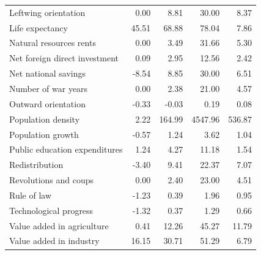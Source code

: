 \documentclass[a4paper,11pt]{article}
\begin{document}
\begin{table}[!ht]
\begin{tabular}{lrrrr}
  Leftwing orientation & 0.00 & 8.81 & 30.00 & 8.37 \\ 
  Life expectancy & 45.51 & 68.88 & 78.04 & 7.86 \\ 
  Natural resources rents & 0.00 & 3.49 & 31.66 & 5.30 \\ 
  Net foreign direct investment & 0.09 & 2.95 & 12.56 & 2.42 \\ 
  Net national savings & -8.54 & 8.85 & 30.00 & 6.51 \\ 
  Number of war years & 0.00 & 2.38 & 21.00 & 4.57 \\ 
  Outward orientation & -0.33 & -0.03 & 0.19 & 0.08 \\ 
  Population density & 2.22 & 164.99 & 4547.96 & 536.87 \\ 
  Population growth & -0.57 & 1.24 & 3.62 & 1.04 \\ 
  Public education expenditures & 1.24 & 4.27 & 11.18 & 1.54 \\ 
  Redistribution & -3.40 & 9.41 & 22.37 & 7.07 \\ 
  Revolutions and coups & 0.00 & 2.40 & 23.00 & 4.51 \\ 
  Rule of law & -1.23 & 0.39 & 1.96 & 0.95 \\ 
  Technological progress & -1.32 & 0.37 & 1.29 & 0.66 \\ 
  Value added in agriculture & 0.41 & 12.26 & 45.27 & 11.79 \\ 
  Value added in industry & 16.15 & 30.71 & 51.29 & 6.79 \\
   \bottomrule
\end{tabular}
\end{table}
\clearpage

%
%
\eject \pdfpagewidth=18.53in \pdfpageheight=11.69in %
\setlength\tabcolsep{2pt}
\end{document}
